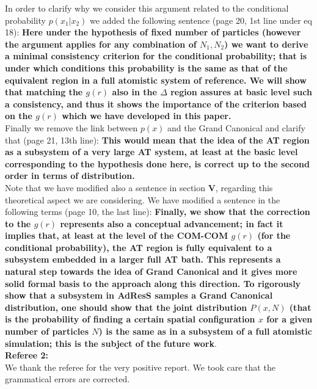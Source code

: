 \documentclass[a4paper]{article}
\begin{document}
In order to clarify why we consider this argument related to the conditional probability $p(x_{1}|x_{2})$ we added the following sentence (page 20, 1st line under eq 18): {\bf Here under the hypothesis of fixed number of particles (however the argument applies for any combination of $N_{1},N_{2}$) we want to derive a minimal consistency criterion for the conditional probability; that is under which conditions this probability is the same as that of the equivalent region in a full atomistic system of reference. We will show that matching the $g(r)$ also in the $\Delta$ region assures at basic level such a consistency, and thus it shows the importance of the criterion based on the $g(r)$ which we have developed in this paper.}\\
Finally we remove the link between $p(x)$ and the Grand Canonical and clarify that (page 21, 13th line): {\bf This would mean that the idea of the AT region as a subsystem of a very large AT system, at least at the basic level corresponding to the hypothesis done here, is correct up to the second order in terms of distribution.} 
\\
Note that we have modified also a sentence in section {\bf V}, regarding this theoretical aspect we are considering. We have modified a sentence in the following terms (page 10, the last line): {\bf Finally, we show that the correction to the $g(r)$ represents also a conceptual advancement; in fact it implies that, at least at the level of the COM-COM $g(r)$ (for the conditional probability), the AT region is fully equivalent to a subsystem embedded in a larger full AT bath. This  represents a natural step towards the idea of Grand Canonical and it gives more solid formal basis to the approach along this direction. To rigorously show that a subsystem in AdResS samples a Grand Canonical distribution, one should show that the joint distribution $P(x,N)$ (that is the probability of finding a certain spatial configuration $x$ for a given number of particles $N$) is the same as in a subsystem of a full atomistic simulation; this is the subject of the future work}.\\

\vskip 1cm
\noindent
{\bf Referee 2:}\\

We thank the referee for the very positive report. We took care that the grammatical errors are corrected.\\
\end{document}
